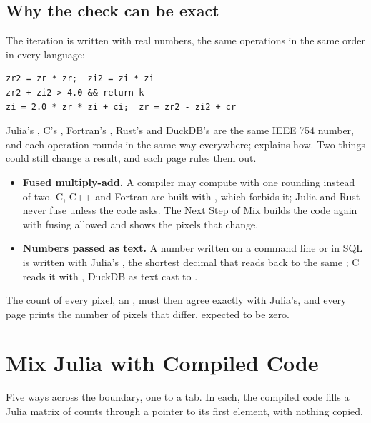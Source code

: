 \subsection{Why the check can be exact}
The iteration is written with real numbers, the same operations in the same order in every language:
\begin{lstlisting}
zr2 = zr * zr;  zi2 = zi * zi
zr2 + zi2 > 4.0 && return k
zi = 2.0 * zr * zi + ci;  zr = zr2 - zi2 + cr
\end{lstlisting}
Julia's , C's , Fortran's , Rust's  and DuckDB's
 are the same IEEE 754 number, and each operation rounds in the same way everywhere;  explains how. Two things could
still change a result, and each page rules them out.
\begin{itemize}
  \item \textbf{Fused multiply-add.} A compiler may compute  with one rounding instead of two. C, C++
    and Fortran are built with , which forbids it; Julia and Rust never fuse unless the code
    asks. The Next Step  of Mix builds the code again with fusing allowed and shows the pixels
    that change.
  \item \textbf{Numbers passed as text.} A number written on a command line or in SQL is written with Julia's
    , the shortest decimal that reads back to the same ; C reads it with , DuckDB
    as text cast to .
\end{itemize}
The count of every pixel, an , must then agree exactly with Julia's, and every page prints the number of
pixels that differ, expected to be zero.

\section{Mix Julia with Compiled Code}\label{sec:mix}
Five ways across the boundary, one to a tab. In each, the compiled code fills a Julia matrix of counts through a
pointer to its first element, with nothing copied.

